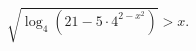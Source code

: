 \begin{ex}[type=inequality]
	\begin{condition}
		$\sqrt{\log_4(21 - 5\cdot4^{2 - x^2})}>x  .$
	\end{condition}
\end{ex}